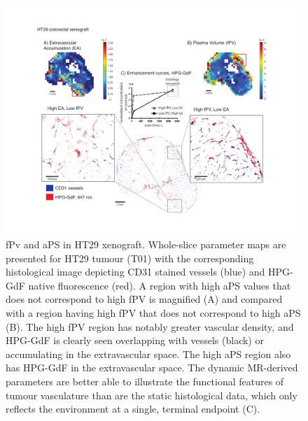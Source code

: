 \begin{figure}[htbp]   
 \begin{center}  
 \includegraphics[width=\textwidth]{hpg/hpg-images/hpg_fig5-ht29fpv.pdf}
 \caption{fPv and aPS in HT29 xenograft. Whole-slice parameter maps are presented for HT29 tumour (T01) with the corresponding histological image depicting CD31 stained vessels (blue) and HPG-GdF native fluorescence (red). A region with high aPS values that does not correspond to high fPV is magnified (A) and compared with a region having high fPV that does not correspond to high aPS (B). The high fPV region has notably greater vascular density, and HPG-GdF is clearly seen overlapping with vessels (black) or accumulating in the extravascular space. The high aPS region also has HPG-GdF in the extravascular space. The dynamic MR-derived parameters are better able to illustrate the functional features of tumour vasculature than are the static histological data, which only reflects the environment at a single, terminal endpoint (C).}  
 \label{hpgpaper:fig5}  
 \end{center}
\end{figure}

